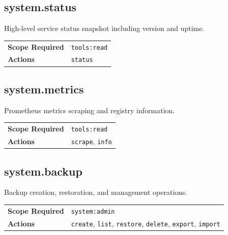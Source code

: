 \subsection{system.status}

High-level service status snapshot including version and uptime.

\begin{table}[ht]
\centering
\small
\begin{tabularx}{\textwidth}{lX}
    \hline
    \textbf{Scope Required} & \texttt{tools:read} \\
    \textbf{Actions} & \texttt{status} \\
    \hline
\end{tabularx}
\end{table}

\subsection{system.metrics}

Prometheus metrics scraping and registry information.

\begin{table}[ht]
\centering
\small
\begin{tabularx}{\textwidth}{lX}
    \hline
    \textbf{Scope Required} & \texttt{tools:read} \\
    \textbf{Actions} & \texttt{scrape}, \texttt{info} \\
    \hline
\end{tabularx}
\end{table}

\subsection{system.backup}

Backup creation, restoration, and management operations.

\begin{table}[ht]
\centering
\small
\begin{tabularx}{\textwidth}{lX}
    \hline
    \textbf{Scope Required} & \texttt{system:admin} \\
    \textbf{Actions} & \texttt{create}, \texttt{list}, \texttt{restore}, \texttt{delete}, \texttt{export}, \texttt{import} \\
    \hline
\end{tabularx}
\end{table}

